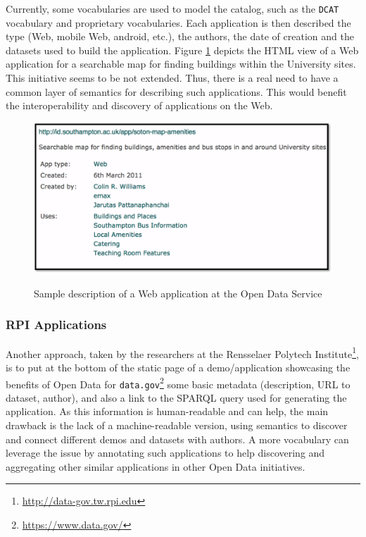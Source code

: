 Currently, some vocabularies are used to model the catalog, such as the \texttt{DCAT} vocabulary \cite{dcat} and proprietary vocabularies. Each application is then described the type (Web, mobile Web, android, etc.), the authors, the date of creation and the datasets used to build the application. Figure \ref{fig:app-amenity} depicts the HTML view of a Web application
for a searchable map for finding buildings within the University sites. This initiative seems to be not extended. Thus, there is a real need to have a common layer of semantics for describing such applications. This would benefit the interoperability and discovery of applications on the Web.
\begin{figure}
\includegraphics[scale=.7]{img/soton-map-amenities.pdf}
\label{fig:app-amenity}
\vspace{-10pt}
\caption{Sample description of a Web application  at the Open Data Service}
\end{figure}

\subsubsection{RPI Applications}
Another approach, taken by the researchers at the Rensselaer Polytech Institute\footnote{\url{http://data-gov.tw.rpi.edu}}, is to put at the bottom of the static page of a demo/application showcasing the benefits of Open Data for \texttt{data.gov}\footnote{\url{https://www.data.gov/}} some basic metadata (description, URL to dataset, author), and also a link to the SPARQL query used for generating the application. As this information is human-readable and can help, the main drawback is the lack of a machine-readable version, using semantics to discover and connect different demos and datasets with authors. A more vocabulary can leverage the issue by annotating such applications to help discovering and aggregating other similar applications in other Open Data initiatives.



